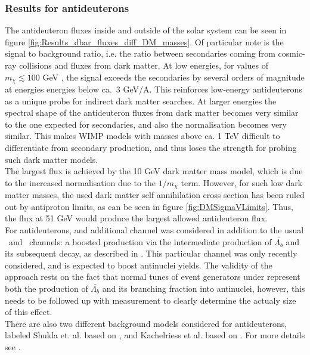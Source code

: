\subsubsection{Results for antideuterons}
The antideuteron fluxes inside and outside of the solar system can be seen in figure \ref{fig:Results_dbar_fluxes_diff_DM_masses}. Of particular note is the signal to background ratio, i.e. the ratio between secondaries coming from cosmic-ray collisions and fluxes from dark matter. At low energies, for values of $m_\chi \lesssim 100$ GeV , the signal exceeds the secondaries by several orders of magnitude at energies energies below ca.\ 3 GeV/A. This reinforces low-energy antideuterons as a unique probe for indirect dark matter searches. At larger energies the spectral shape of the antideuteron fluxes from dark matter becomes very similar to the one expected for secondaries, and also the normalisation becomes very similar. This makes WIMP models with masses above ca. 1 TeV difficult to differentiate from secondary production, and thus loses the strength for probing such dark matter models. \\
The largest flux is achieved by the 10 GeV dark matter mass model, which is due to the increased normalisation due to the $1/m_\chi$ term. However, for such low dark matter masses, the used dark matter self annihilation cross section has been ruled out by antiproton limits, as can be seen in figure \ref{fig:DMSigmaVLimits}. Thus, the flux at 51 GeV would produce the largest allowed antideuteron flux. \\

For antideuterons, and additional channel was considered in addition to the usual \WW\ and \bb\ channels: a boosted production via the intermediate production of $\overline{\Lambda_b}$ and its subsequent decay, as described in \cite{Winkler_2021}. This particular channel was only recently considered, and is expected to boost antinuclei yields. The validity of the approach rests on the fact that normal tunes of event generators under represent both the production of $\overline{\Lambda_b}$ and its branching fraction into antinuclei, however, this needs to be followed up with measurement to clearly determine the actualy size of this effect. \\
There are also two different background models considered for antideuterons, labeled Shukla et. al. based on \cite{Shukla_2020}, and Kachelriess et al. based on \cite{Kachelriess:2020uoh}. For more details see \cite{Serksnyte:2022onw}.

